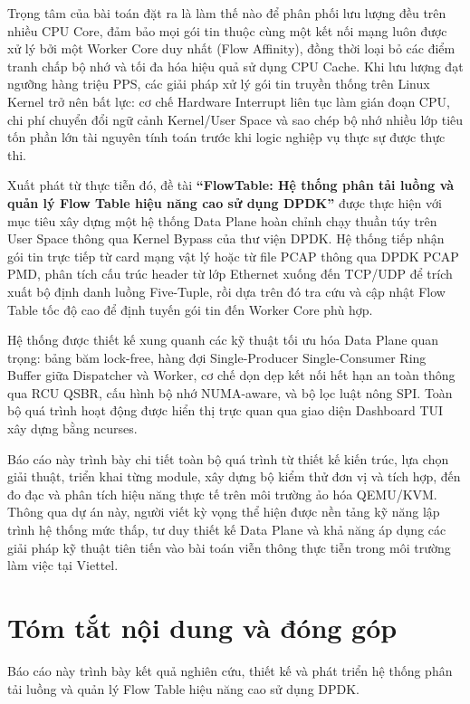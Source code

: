 \documentclass[12pt,a4paper,twoside]{report}
\begin{document}
Trọng tâm của bài toán đặt ra là làm thế nào để phân phối lưu lượng đều trên nhiều CPU Core, đảm bảo mọi gói tin thuộc cùng một kết nối mạng luôn được xử lý bởi một Worker Core duy nhất (Flow Affinity), đồng thời loại bỏ các điểm tranh chấp bộ nhớ và tối đa hóa hiệu quả sử dụng CPU Cache. Khi lưu lượng đạt ngưỡng hàng triệu PPS, các giải pháp xử lý gói tin truyền thống trên Linux Kernel trở nên bất lực: cơ chế Hardware Interrupt liên tục làm gián đoạn CPU, chi phí chuyển đổi ngữ cảnh Kernel/User Space và sao chép bộ nhớ nhiều lớp tiêu tốn phần lớn tài nguyên tính toán trước khi logic nghiệp vụ thực sự được thực thi.

Xuất phát từ thực tiễn đó, đề tài \textbf{``FlowTable: Hệ thống phân tải luồng và quản lý Flow Table hiệu năng cao sử dụng DPDK''} được thực hiện với mục tiêu xây dựng một hệ thống Data Plane hoàn chỉnh chạy thuần túy trên User Space thông qua Kernel Bypass của thư viện DPDK. Hệ thống tiếp nhận gói tin trực tiếp từ card mạng vật lý hoặc từ file PCAP thông qua DPDK PCAP PMD, phân tích cấu trúc header từ lớp Ethernet xuống đến TCP/UDP để trích xuất bộ định danh luồng Five-Tuple, rồi dựa trên đó tra cứu và cập nhật Flow Table tốc độ cao để định tuyến gói tin đến Worker Core phù hợp.

Hệ thống được thiết kế xung quanh các kỹ thuật tối ưu hóa Data Plane quan trọng: bảng băm lock-free, hàng đợi Single-Producer Single-Consumer Ring Buffer giữa Dispatcher và Worker, cơ chế dọn dẹp kết nối hết hạn an toàn thông qua RCU QSBR, cấu hình bộ nhớ NUMA-aware, và bộ lọc luật nông SPI. Toàn bộ quá trình hoạt động được hiển thị trực quan qua giao diện Dashboard TUI xây dựng bằng ncurses.

Báo cáo này trình bày chi tiết toàn bộ quá trình từ thiết kế kiến trúc, lựa chọn giải thuật, triển khai từng module, xây dựng bộ kiểm thử đơn vị và tích hợp, đến đo đạc và phân tích hiệu năng thực tế trên môi trường ảo hóa QEMU/KVM. Thông qua dự án này, người viết kỳ vọng thể hiện được nền tảng kỹ năng lập trình hệ thống mức thấp, tư duy thiết kế Data Plane và khả năng áp dụng các giải pháp kỹ thuật tiên tiến vào bài toán viễn thông thực tiễn trong môi trường làm việc tại Viettel.

\chapter*{Tóm tắt nội dung và đóng góp}
Báo cáo này trình bày kết quả nghiên cứu, thiết kế và phát triển hệ thống phân tải luồng và quản lý Flow Table hiệu năng cao sử dụng DPDK.
\end{document}

